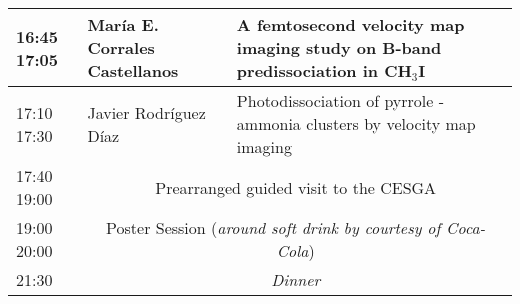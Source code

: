 \begin{flushleft}
\begin{tabular}{|m{1.0cm}|m{4.8cm}|m{10.2cm}|}
\hline
16:45 17:05 & Mar\'ia E. Corrales Castellanos & A femtosecond velocity map imaging study on B-band predissociation in CH$_3$I \\ 
\hline
17:10 17:30 & Javier Rodr\'iguez D\'iaz & Photodissociation of pyrrole - ammonia clusters by velocity map imaging \\ 
\hline
17:40 19:00 & \multicolumn{2}{c|}{Prearranged guided visit to the CESGA} \\ 
\hline
19:00 20:00 & \multicolumn{2}{c|}{Poster Session ({\it around soft drink by courtesy of Coca-Cola})} \\ 
\hline
21:30 & \multicolumn{2}{c|}{\it Dinner} \\ 
\hline
\end{tabular}
\end{flushleft}
\newpage
\vspace{4.0cm}
